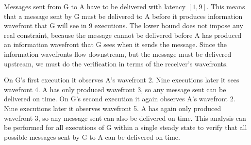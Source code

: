 Messages sent from {\filter} G to {\filter} A have to be delivered
with latency $[1,9]$.  This means that a message sent by {\filter} G
must be delivered to {\filter} A before it produces information
wavefront that G will see in 9 executions.  The lower bound does
not impose any real constraint, because the message cannot be
delivered before A has produced an information wavefront that G
sees when it sends the message.  Since the information wavefronts
flow downstream, but the message must be delivered upstream, we
must do the verification in terms of the receiver's wavefronts.

On G's first execution it observes A's wavefront 2.  Nine
executions later it sees wavefront 4.  {\filter} A has only produced
wavefront 3, so any message sent can be delivered on time. On G's
second execution it again observes A's wavefront 2.  Nine
executions later it observes wavefront 5.  {\filter} A has again
only produced wavefront 3, so any message sent can also be
delivered on time. This analysis can be performed for all
executions of G within a single steady state to verify that all
possible messages sent by G to A can be delivered on time.

